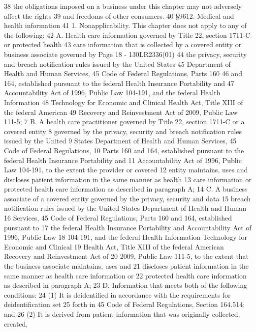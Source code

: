 38 the obligations imposed on a business under this chapter may not adversely affect the rights
39 and freedoms of other consumers.
40 §9612. Medical and health information
41 1. Nonapplicability. This chapter does not apply to any of the following:
42 A. Health care information governed by Title 22, section 1711-C or protected health
43 care information that is collected by a covered entity or business associate governed by 
Page 18 - 130LR2336(01)
44 the privacy, security and breach notification rules issued by the United States
45 Department of Health and Human Services, 45 Code of Federal Regulations, Parts 160
46 and 164, established pursuant to the federal Health Insurance Portability and
47 Accountability Act of 1996, Public Law 104-191, and the federal Health Information
48 Technology for Economic and Clinical Health Act, Title XIII of the federal American
49 Recovery and Reinvestment Act of 2009, Public Law 111-5;
7 B. A health care practitioner governed by Title 22, section 1711-C or a covered entity
8 governed by the privacy, security and breach notification rules issued by the United
9 States Department of Health and Human Services, 45 Code of Federal Regulations,
10 Parts 160 and 164, established pursuant to the federal Health Insurance Portability and
11 Accountability Act of 1996, Public Law 104-191, to the extent the provider or covered
12 entity maintains, uses and discloses patient information in the same manner as health
13 care information or protected health care information as described in paragraph A;
14 C. A business associate of a covered entity governed by the privacy, security and data
15 breach notification rules issued by the United States Department of Health and Human
16 Services, 45 Code of Federal Regulations, Parts 160 and 164, established pursuant to
17 the federal Health Insurance Portability and Accountability Act of 1996, Public Law
18 104-191, and the federal Health Information Technology for Economic and Clinical
19 Health Act, Title XIII of the federal American Recovery and Reinvestment Act of
20 2009, Public Law 111-5, to the extent that the business associate maintains, uses and
21 discloses patient information in the same manner as health care information or
22 protected health care information as described in paragraph A;
23 D. Information that meets both of the following conditions:
24 (1) It is deidentified in accordance with the requirements for deidentification set
25 forth in 45 Code of Federal Regulations, Section 164.514; and
26 (2) It is derived from patient information that was originally collected, created,
